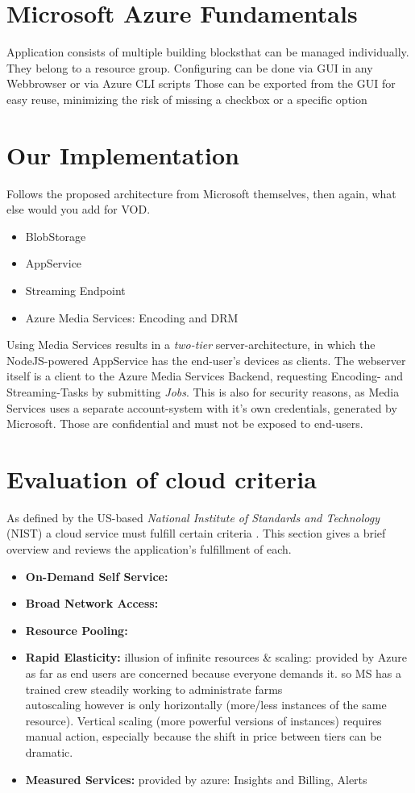 \documentclass[english]{lni}
\begin{document}
\section{Microsoft Azure Fundamentals}
Application consists of multiple \glqq building blocks\grqq that can be managed individually.
They belong to a resource group.
Configuring can be done via GUI in any Webbrowser or via Azure CLI scripts
Those can be exported from the GUI for easy reuse, minimizing the risk of missing a checkbox or a specific option

\section{Our Implementation}
Follows the proposed architecture from Microsoft themselves, then again, what else would you add for VOD.
\begin{itemize}
    \item BlobStorage
    \item AppService
    \item Streaming Endpoint
    \item Azure Media Services: Encoding and DRM
\end{itemize}

Using Media Services results in a \textit{two-tier} server-architecture, in which the NodeJS-powered AppService has the end-user's devices
as clients. The webserver itself is a client to the Azure Media Services Backend, requesting Encoding- and Streaming-Tasks by
submitting \textit{Jobs}. This is also for security reasons, as Media Services uses a separate account-system with it's own credentials, 
generated by Microsoft.
Those are confidential and must not be exposed to end-users.

\section{Evaluation of cloud criteria}
As defined by the US-based \textit{National Institute of Standards and Technology} (NIST) a cloud service must fulfill
certain criteria \cite{nistCloud}. This section gives a brief overview and reviews the application's fulfillment of each.
\begin{itemize}
    \item \textbf{On-Demand Self Service:}
    \item \textbf{Broad Network Access:}
    \item \textbf{Resource Pooling:}
    \item \textbf{Rapid Elasticity:} illusion of infinite resources \& scaling: provided by Azure as far as end users are concerned because everyone demands it. so MS has a trained 
    crew steadily working to administrate farms\\
    autoscaling however is only horizontally (more/less instances of the same resource). Vertical scaling (more powerful versions of instances) requires manual action, especially because the shift in price between tiers can be dramatic.
    \item \textbf{Measured Services:} provided by azure: Insights and Billing, Alerts
\end{itemize}
\end{document}
